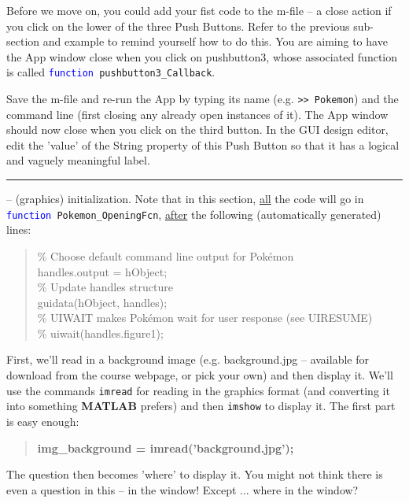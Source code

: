 \documentclass{tufte-book} %
\newenvironment{docspec}{\begin{quotation}\ttfamily\parskip0pt\parindent0pt\ignorespaces}{\end{quotation}}
\newenvironment{docspecbold}{\begin{quotation}\ttfamily\bfseries\parskip0pt\parindent0pt\ignorespaces}{\end{quotation}}
\begin{document}
Before we move on, you could add your fist code to the \textsf{m-file} -- a close action if you click on the lower of the three \textsf{Push Buttons}. Refer to the previous sub-section and example to remind yourself how to do this. You are aiming to have the App window close when you click on \textsf{pushbutton3}, whose associated function is called \texttt{\textcolor{blue}{function} pushbutton3\_Callback}.

Save the \textsf{m-file} and re-run the App by typing its name (e.g. \texttt{>> Pokemon}) and the command line (first closing any already open instances of it). The App window should now close when you click on the third button. In the GUI design editor, edit the 'value' of the \textsf{String} property of this \textsf{Push Button} so that it has a logical and vaguely meaningful label. 

\vspace{1mm}
\noindent\rule{4cm}{0.5pt}
\vspace{-2mm}

 -- (graphics) initialization. Note that in this section, \uline{all} the code will go in \texttt{\textcolor{blue}{function} Pokemon\_OpeningFcn}, \uline{after} the following (automatically generated) lines:
\begin{docspec}
\textcolor[rgb]{0,0.501961,0}{\% Choose default command line output for Pok\'emon}
\\handles.output = hObject;
\textcolor[rgb]{0,0.501961,0}{\\\% Update handles structure}
\\guidata(hObject, handles);
\textcolor[rgb]{0,0.501961,0}{\\\% UIWAIT makes Pok\'emon wait for user response (see UIRESUME)
\\\% uiwait(handles.figure1);}
\end{docspec}

First, we'll read in a background image (e.g. \textsf{background.jpg} -- available for download from the  course webpage, or pick your own) and then display it. We'll use the commands \texttt{imread} for reading in the graphics format (and converting it into something \textbf{MATLAB} prefers) and then \texttt{imshow} to display it. The first part is easy enough:
\begin{docspecbold}
img\_background = imread(\textcolor[rgb]{0.501961,0,1}{'background.jpg'});
\end{docspecbold}
The question then becomes 'where' to display it. You might not think there is even a question in this -- in the window! Except ... where in the window?
\end{document}
